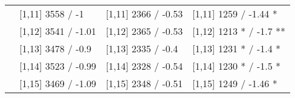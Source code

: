 \begin{table}
\begin{tabular}[t]{llll}
 & {}[1,11] 3558  / -1 & {}[1,11] 2366  / -0.53 & {}[1,11] 1259  / -1.44 *\\
 & {}[1,12] 3541  / -1.01 & {}[1,12] 2365  / -0.53 & {}[1,12] 1213 * / -1.7 **\\
\addlinespace
 & {}[1,13] 3478  / -0.9 & {}[1,13] 2335  / -0.4 & {}[1,13] 1231 * / -1.4 *\\
 & {}[1,14] 3523  / -0.99 & {}[1,14] 2328  / -0.54 & {}[1,14] 1230 * / -1.5 *\\
 & {}[1,15] 3469  / -1.09 & {}[1,15] 2348  / -0.51 & {}[1,15] 1249  / -1.46 *\\
\bottomrule
\end{tabular}
\end{table}

